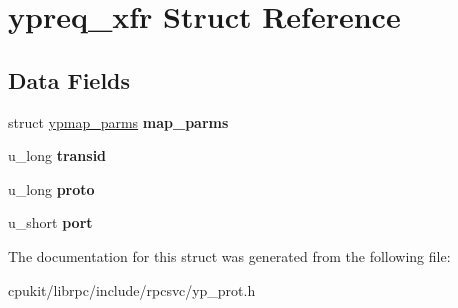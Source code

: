 \hypertarget{structypreq__xfr}{}\section{ypreq\+\_\+xfr Struct Reference}
\label{structypreq__xfr}
\subsection*{Data Fields}
\begin{DoxyCompactItemize}
\item 
\mbox{\label{structypreq__xfr_a255cba8a572b42aee69abca060585802}} 
struct \mbox{\hyperlink{structypmap__parms}{ypmap\+\_\+parms}} {\bfseries map\+\_\+parms}
\item 
\mbox{\label{structypreq__xfr_a6405854c92ed24450e850053181e6595}} 
u\+\_\+long {\bfseries transid}
\item 
\mbox{\label{structypreq__xfr_abaee60f5da43a707511126a875926618}} 
u\+\_\+long {\bfseries proto}
\item 
\mbox{\label{structypreq__xfr_abbf800a6ce7f28ccf6daf45e32087f90}} 
u\+\_\+short {\bfseries port}
\end{DoxyCompactItemize}


The documentation for this struct was generated from the following file\+:\begin{DoxyCompactItemize}
\item 
cpukit/librpc/include/rpcsvc/yp\+\_\+prot.\+h\end{DoxyCompactItemize}
